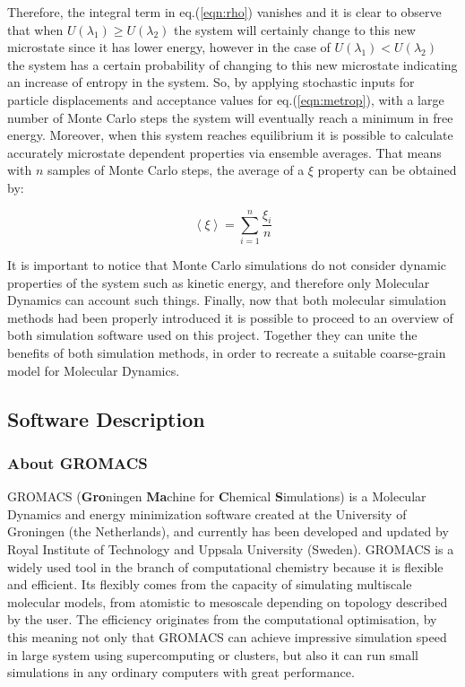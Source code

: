 \documentclass[10pt,a4paper,twoside]{article}
\begin{document}
 Therefore, the integral term in eq.(\ref{eqn:rho}) vanishes and it is clear to observe that when $U(\lambda_1) \geqslant U(\lambda_2)$ the system will certainly change to this new microstate since it has lower energy, however in the case of $U(\lambda_1) < U(\lambda_2)$ the system has a certain probability of changing to this new microstate indicating an increase of entropy in the system. So, by applying stochastic inputs for particle displacements and acceptance values for eq.(\ref{eqn:metrop}), with a large number of Monte Carlo steps the system will eventually reach a minimum in free energy.
  Moreover, when this system reaches equilibrium it is possible to calculate accurately microstate dependent properties via ensemble averages. That means with $n$ samples of Monte Carlo steps, the average of a $ \xi $ property can be obtained by:
 
 \begin{equation}
\left\langle \xi\right\rangle  = \displaystyle \sum_{i=1}^{n} \dfrac{\xi_i}{n}
\label{eqn:average}
\end{equation}

It is important to notice that Monte Carlo simulations do not consider dynamic properties of the system such as kinetic energy, and therefore only Molecular Dynamics can account such things\cite{satoh}. Finally, now that both molecular simulation methods had been properly introduced it is possible to proceed to an overview of both simulation software used on this project. Together they can unite the benefits of both simulation methods, in order to recreate a suitable coarse-grain model for Molecular Dynamics.
\subsection{Software Description}
\subsubsection{About GROMACS}

 GROMACS (\textbf{Gro}ningen \textbf{Ma}chine for \textbf{C}hemical \textbf{S}imulations) \cite{gromanual} is a Molecular Dynamics and energy minimization software created at the University of Groningen (the Netherlands), and currently has been developed and updated by Royal Institute of Technology and Uppsala University (Sweden). GROMACS is a widely used tool in the branch of computational chemistry because it is flexible and efficient. Its flexibly comes from the capacity of simulating multiscale molecular models, from atomistic to mesoscale depending on topology described by the user. The efficiency originates from the computational optimisation, by this meaning not only that GROMACS can achieve impressive simulation speed in large system using supercomputing or clusters, but also it can run small simulations in any ordinary computers with great performance.
 
\end{document}

